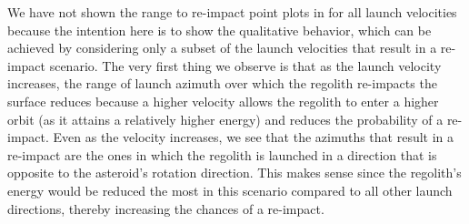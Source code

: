 We have not shown the range to re-impact point plots in  for all launch velocities because the intention here is to show the qualitative behavior, which can be achieved by considering only a subset of the launch velocities that result in a re-impact scenario. The very first thing we observe is that as the launch velocity increases, the range of launch azimuth over which the regolith re-impacts the surface reduces because a higher velocity allows the regolith to enter a higher orbit (as it attains a relatively higher energy) and reduces the probability of a re-impact. Even as the velocity increases, we see that the azimuths that result in a re-impact are the ones in which the regolith is launched in a direction that is opposite to the asteroid's rotation direction. This makes sense since the regolith's energy would be reduced the most in this scenario compared to all other launch directions, thereby increasing the chances of a re-impact.
%
\newline\newline
%
